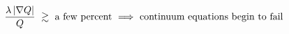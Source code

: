 \documentclass[preview]{standalone}
\begin{document}
\begin{align*}
\special{dvisvgm:raw <g id='unique000'>}\frac{\lambda\,|\nabla Q|}{Q}\ \gtrsim\ \text{a few percent}\ \Longrightarrow\ \text{continuum equations begin to fail}\special{dvisvgm:raw </g>}
\end{align*}
\end{document}
